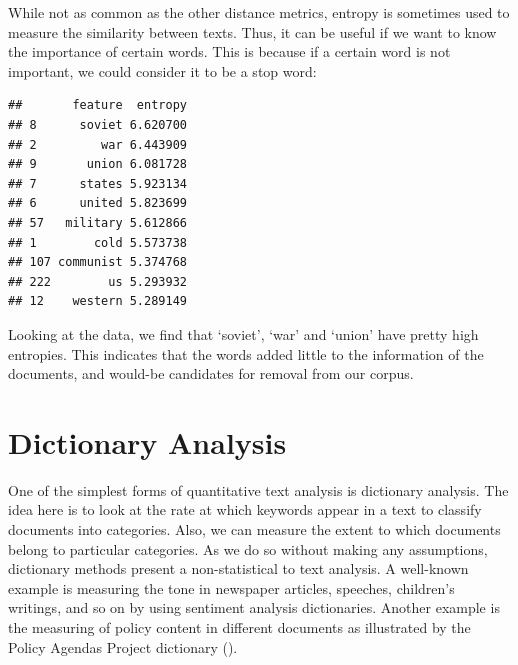 \documentclass[
]{book}
\newenvironment{Shaded}{\begin{snugshade}}{\end{snugshade}}
\newcommand{\DecValTok}[1]{\textcolor[rgb]{0.00,0.00,0.81}{#1}}
\newcommand{\FunctionTok}[1]{\textcolor[rgb]{0.13,0.29,0.53}{\textbf{#1}}}
\newcommand{\NormalTok}[1]{#1}
\newcommand{\OtherTok}[1]{\textcolor[rgb]{0.56,0.35,0.01}{#1}}
\newcommand{\SpecialCharTok}[1]{\textcolor[rgb]{0.81,0.36,0.00}{\textbf{#1}}}
\newcommand{\StringTok}[1]{\textcolor[rgb]{0.31,0.60,0.02}{#1}}
\begin{document}
While not as common as the other distance metrics, entropy is sometimes used to measure the similarity between texts. Thus, it can be useful if we want to know the importance of certain words. This is because if a certain word is not important, we could consider it to be a stop word:

\begin{Shaded}
\end{Shaded}

\begin{verbatim}
##       feature  entropy
## 8      soviet 6.620700
## 2         war 6.443909
## 9       union 6.081728
## 7      states 5.923134
## 6      united 5.823699
## 57   military 5.612866
## 1        cold 5.573738
## 107 communist 5.374768
## 222        us 5.293932
## 12    western 5.289149
\end{verbatim}

Looking at the data, we find that `soviet', `war' and `union' have pretty high entropies. This indicates that the words added little to the information of the documents, and would-be candidates for removal from our corpus.

\chapter{Dictionary Analysis}\label{dictionary-analysis}

One of the simplest forms of quantitative text analysis is dictionary analysis. The idea here is to look at the rate at which keywords appear in a text to classify documents into categories. Also, we can measure the extent to which documents belong to particular categories. As we do so without making any assumptions, dictionary methods present a non-statistical to text analysis. A well-known example is measuring the tone in newspaper articles, speeches, children's writings, and so on by using sentiment analysis dictionaries. Another example is the measuring of policy content in different documents as illustrated by the Policy Agendas Project dictionary ().
\end{document}
